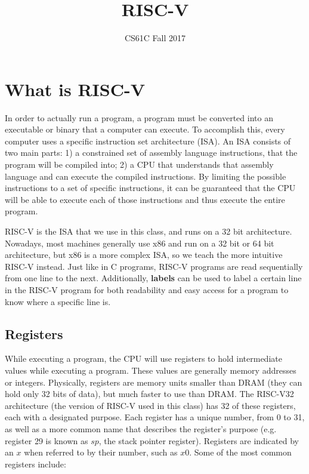 \documentclass{article}
\title{RISC-V}
\author{CS61C Fall 2017}
\date{ }
\begin{document}
\maketitle
\tableofcontents

\section{What is RISC-V}
In order to actually run a program, a program must be converted into an executable or binary that a computer can execute. To accomplish this, every computer uses a specific instruction set architecture (ISA). An ISA consists of two main parts: 1) a constrained set of assembly language instructions, that the program will be compiled into; 2) a CPU that understands that assembly language and can execute the compiled instructions. By limiting the possible instructions to a set of specific instructions, it can be guaranteed that the CPU will be able to execute each of those instructions and thus execute the entire program.

RISC-V is the ISA that we use in this class, and runs on a 32 bit architecture. Nowadays, most machines generally use x86 and run on a 32 bit or 64 bit architecture, but x86 is a more complex ISA, so we teach the more intuitive RISC-V instead. Just like in C programs, RISC-V programs are read sequentially from one line to the next.  Additionally, \textbf{labels} can be used to label a certain line in the RISC-V program for both readability and easy access for a program to know where a specific line is.

\subsection{Registers}
While executing a program, the CPU will use registers to hold intermediate values while executing a program. These values are generally memory addresses or integers. Physically, registers are memory units smaller than DRAM (they can hold only 32 bits of data), but much faster to use than DRAM. The RISC-V32 architecture (the version of RISC-V used in this class) has 32 of these registers, each with a designated purpose. Each register has a unique number, from 0 to 31, as well as a more common name that describes the register's purpose (e.g. register 29 is known as $sp$, the stack pointer register). Registers are indicated by an $x$ when referred to by their number, such as $x0$. Some of the most common registers include: 
\end{document}
